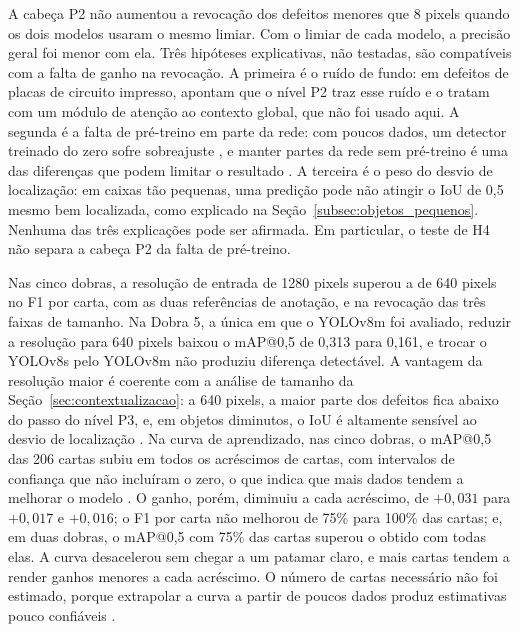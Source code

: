 \documentclass[
    12pt,                %
    openright,           %
    oneside,             %
    a4paper,             %
    english,             %
    brazil               %
]{abntex2}
\begin{document}
A cabeça P2 não aumentou a revocação dos defeitos menores que 8 pixels
quando os dois modelos usaram o mesmo limiar. Com o limiar de cada
modelo, a precisão geral foi menor com ela. Três
hipóteses explicativas, não testadas, são compatíveis com a falta de
ganho na revocação. A primeira é o ruído de fundo: em defeitos de placas de
circuito impresso, 
apontam que o nível P2 traz esse ruído e o tratam com um módulo de
atenção ao contexto global, que não foi usado aqui. A segunda é a falta
de pré-treino em parte da rede: com poucos dados, um detector treinado
do zero sofre sobreajuste \cite{He2019}, e manter partes da rede sem
pré-treino é uma das diferenças que podem limitar o resultado
\cite{LiM2023}. A terceira é o peso do desvio de localização: em caixas
tão pequenas, uma predição pode não atingir o IoU de 0,5 mesmo bem
localizada, como explicado na Seção~\ref{subsec:objetos_pequenos}.
Nenhuma das três explicações pode ser afirmada. Em particular, o teste
de H4 não separa a cabeça P2 da falta de pré-treino.

Nas cinco dobras, a resolução de entrada de 1280 pixels superou a de
640 pixels no F1 por carta, com as duas referências de anotação, e na
revocação das três faixas de tamanho. Na Dobra 5, a única em que o
YOLOv8m foi avaliado, reduzir a resolução para 640 pixels baixou o
mAP@0,5 de 0,313 para 0,161, e trocar o YOLOv8s pelo YOLOv8m não produziu
diferença detectável. A vantagem da resolução maior é
coerente com a análise de tamanho da Seção~\ref{sec:contextualizacao}: a
640 pixels, a maior parte dos defeitos fica abaixo do passo do nível P3,
e, em objetos diminutos, o IoU é altamente sensível ao desvio de
localização \cite{Xu2022}. Na curva de aprendizado, nas cinco dobras, o
mAP@0,5 das 206 cartas subiu em todos os acréscimos de cartas, com
intervalos de confiança que não incluíram o zero, o que indica que mais
dados tendem a melhorar o modelo \cite{Viering2023}. O ganho, porém,
diminuiu a cada acréscimo, de $+0{,}031$ para $+0{,}017$ e $+0{,}016$;
o F1 por carta não melhorou de 75\% para 100\% das cartas; e, em duas
dobras, o mAP@0,5 com 75\% das cartas superou o obtido com todas elas.
A curva desacelerou sem chegar a um patamar claro, e mais cartas
tendem a render ganhos menores a cada acréscimo. O número de cartas necessário não foi estimado,
porque extrapolar a curva a partir de poucos dados produz estimativas
pouco confiáveis \cite{Mahmood2022}.
\end{document}
